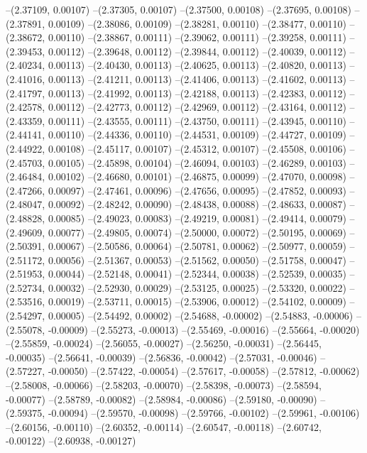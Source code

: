 --(2.37109, 0.00107)
--(2.37305, 0.00107)
--(2.37500, 0.00108)
--(2.37695, 0.00108)
--(2.37891, 0.00109)
--(2.38086, 0.00109)
--(2.38281, 0.00110)
--(2.38477, 0.00110)
--(2.38672, 0.00110)
--(2.38867, 0.00111)
--(2.39062, 0.00111)
--(2.39258, 0.00111)
--(2.39453, 0.00112)
--(2.39648, 0.00112)
--(2.39844, 0.00112)
--(2.40039, 0.00112)
--(2.40234, 0.00113)
--(2.40430, 0.00113)
--(2.40625, 0.00113)
--(2.40820, 0.00113)
--(2.41016, 0.00113)
--(2.41211, 0.00113)
--(2.41406, 0.00113)
--(2.41602, 0.00113)
--(2.41797, 0.00113)
--(2.41992, 0.00113)
--(2.42188, 0.00113)
--(2.42383, 0.00112)
--(2.42578, 0.00112)
--(2.42773, 0.00112)
--(2.42969, 0.00112)
--(2.43164, 0.00112)
--(2.43359, 0.00111)
--(2.43555, 0.00111)
--(2.43750, 0.00111)
--(2.43945, 0.00110)
--(2.44141, 0.00110)
--(2.44336, 0.00110)
--(2.44531, 0.00109)
--(2.44727, 0.00109)
--(2.44922, 0.00108)
--(2.45117, 0.00107)
--(2.45312, 0.00107)
--(2.45508, 0.00106)
--(2.45703, 0.00105)
--(2.45898, 0.00104)
--(2.46094, 0.00103)
--(2.46289, 0.00103)
--(2.46484, 0.00102)
--(2.46680, 0.00101)
--(2.46875, 0.00099)
--(2.47070, 0.00098)
--(2.47266, 0.00097)
--(2.47461, 0.00096)
--(2.47656, 0.00095)
--(2.47852, 0.00093)
--(2.48047, 0.00092)
--(2.48242, 0.00090)
--(2.48438, 0.00088)
--(2.48633, 0.00087)
--(2.48828, 0.00085)
--(2.49023, 0.00083)
--(2.49219, 0.00081)
--(2.49414, 0.00079)
--(2.49609, 0.00077)
--(2.49805, 0.00074)
--(2.50000, 0.00072)
--(2.50195, 0.00069)
--(2.50391, 0.00067)
--(2.50586, 0.00064)
--(2.50781, 0.00062)
--(2.50977, 0.00059)
--(2.51172, 0.00056)
--(2.51367, 0.00053)
--(2.51562, 0.00050)
--(2.51758, 0.00047)
--(2.51953, 0.00044)
--(2.52148, 0.00041)
--(2.52344, 0.00038)
--(2.52539, 0.00035)
--(2.52734, 0.00032)
--(2.52930, 0.00029)
--(2.53125, 0.00025)
--(2.53320, 0.00022)
--(2.53516, 0.00019)
--(2.53711, 0.00015)
--(2.53906, 0.00012)
--(2.54102, 0.00009)
--(2.54297, 0.00005)
--(2.54492, 0.00002)
--(2.54688, -0.00002)
--(2.54883, -0.00006)
--(2.55078, -0.00009)
--(2.55273, -0.00013)
--(2.55469, -0.00016)
--(2.55664, -0.00020)
--(2.55859, -0.00024)
--(2.56055, -0.00027)
--(2.56250, -0.00031)
--(2.56445, -0.00035)
--(2.56641, -0.00039)
--(2.56836, -0.00042)
--(2.57031, -0.00046)
--(2.57227, -0.00050)
--(2.57422, -0.00054)
--(2.57617, -0.00058)
--(2.57812, -0.00062)
--(2.58008, -0.00066)
--(2.58203, -0.00070)
--(2.58398, -0.00073)
--(2.58594, -0.00077)
--(2.58789, -0.00082)
--(2.58984, -0.00086)
--(2.59180, -0.00090)
--(2.59375, -0.00094)
--(2.59570, -0.00098)
--(2.59766, -0.00102)
--(2.59961, -0.00106)
--(2.60156, -0.00110)
--(2.60352, -0.00114)
--(2.60547, -0.00118)
--(2.60742, -0.00122)
--(2.60938, -0.00127)
